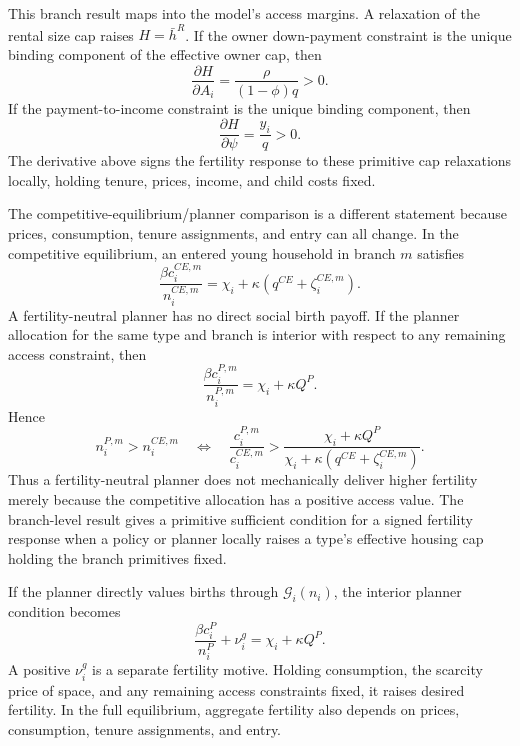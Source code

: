 \documentclass[11pt]{article}
\newcommand{\1}{\mathbf 1}
\begin{document}
This branch result maps into the model's access margins. A relaxation of the rental size cap raises $H=\bar h^R$. If the owner down-payment constraint is the unique binding component of the effective owner cap, then
\[
\frac{\partial H}{\partial A_i}
=
\frac{\rho}{(1-\phi)q}>0.
\]
If the payment-to-income constraint is the unique binding component, then
\[
\frac{\partial H}{\partial \psi}
=
\frac{y_i}{q}>0.
\]
The derivative above signs the fertility response to these primitive cap relaxations locally, holding tenure, prices, income, and child costs fixed.

The competitive-equilibrium/planner comparison is a different statement because prices, consumption, tenure assignments, and entry can all change. In the competitive equilibrium, an entered young household in branch $m$ satisfies
\[
\frac{\beta c_i^{CE,m}}{n_i^{CE,m}}
=
\chi_i+\kappa(q^{CE}+\zeta_i^{CE,m}).
\]
A fertility-neutral planner has no direct social birth payoff. If the planner allocation for the same type and branch is interior with respect to any remaining access constraint, then
\[
\frac{\beta c_i^{P,m}}{n_i^{P,m}}
=
\chi_i+\kappa Q^{P}.
\]
Hence
\[
n_i^{P,m}>n_i^{CE,m}
\quad\Longleftrightarrow\quad
\frac{c_i^{P,m}}{c_i^{CE,m}}
>
\frac{\chi_i+\kappa Q^{P}}
{\chi_i+\kappa(q^{CE}+\zeta_i^{CE,m})}.
\]
Thus a fertility-neutral planner does not mechanically deliver higher fertility merely because the competitive allocation has a positive access value. The branch-level result gives a primitive sufficient condition for a signed fertility response when a policy or planner locally raises a type's effective housing cap holding the branch primitives fixed.

If the planner directly values births through $\mathcal G_i(n_i)$, the interior planner condition becomes
\[
\frac{\beta c_i^P}{n_i^P}+\nu_i^g
=
\chi_i+\kappa Q^{P}.
\]
A positive $\nu_i^g$ is a separate fertility motive. Holding consumption, the scarcity price of space, and any remaining access constraints fixed, it raises desired fertility. In the full equilibrium, aggregate fertility also depends on prices, consumption, tenure assignments, and entry.
\end{document}
